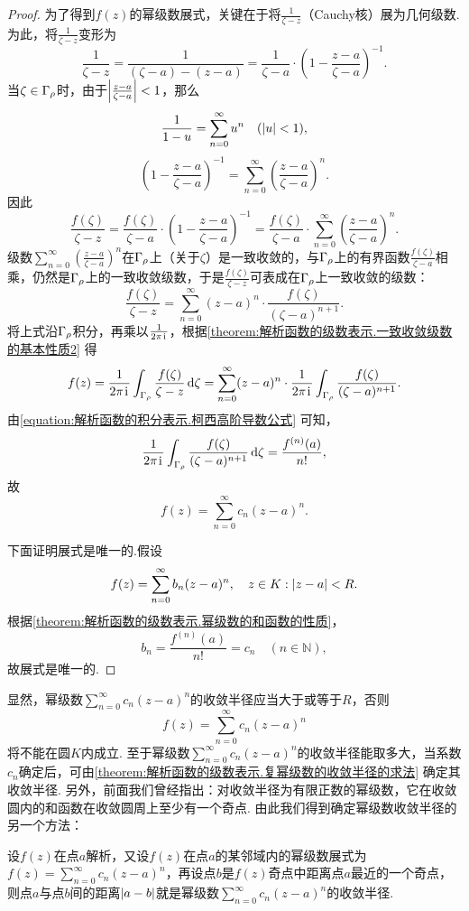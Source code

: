 \begin{theorem}
\begin{proof}
为了得到\(f(z)\)的幂级数展式，关键在于将\(\frac{1}{\zeta-z}\)（Cauchy核）展为几何级数.为此，将\(\frac{1}{\zeta-z}\)变形为\[
\frac{1}{\zeta-z}
= \frac{1}{(\zeta-a)-(z-a)}
= \frac{1}{\zeta-a} \cdot \left(1 - \frac{z-a}{\zeta-a}\right)^{-1}.
\]当\(\zeta \in \Gamma_{\rho}\)时，由于\(\abs{\frac{z-a}{\zeta-a}}<1\)，那么\[
\frac{1}{1-u} = \sum\limits_{n=0}^{\infty} u^n
\quad(\abs{u}<1),
\]\[
\left(1 - \frac{z-a}{\zeta-a}\right)^{-1}
= \sum\limits_{n=0}^{\infty} \left(\frac{z-a}{\zeta-a}\right)^n.
\]因此\[
\frac{f(\zeta)}{\zeta-z}
= \frac{f(\zeta)}{\zeta-a} \cdot \left(1 - \frac{z-a}{\zeta-a}\right)^{-1}
= \frac{f(\zeta)}{\zeta-a} \cdot \sum\limits_{n=0}^{\infty} \left(\frac{z-a}{\zeta-a}\right)^n.
\]级数\(\sum\limits_{n=0}^{\infty} \left(\frac{z-a}{\zeta-a}\right)^n\)在\(\Gamma_{\rho}\)上（关于\(\zeta\)）是一致收敛的，与\(\Gamma_{\rho}\)上的有界函数\(\frac{f(\zeta)}{\zeta-a}\)相乘，仍然是\(\Gamma_{\rho}\)上的一致收敛级数，于是\(\frac{f(\zeta)}{\zeta-z}\)可表成在\(\Gamma_{\rho}\)上一致收敛的级数：\[
\frac{f(\zeta)}{\zeta-z}
= \sum\limits_{n=0}^{\infty} (z-a)^n \cdot \frac{f(\zeta)}{(\zeta-a)^{n+1}}.
\]将上式沿\(\Gamma_{\rho}\)积分，再乘以\(\frac{1}{2\pi\kern1pt\mathrm{i}\kern1pt}\)，根据\cref{theorem:解析函数的级数表示.一致收敛级数的基本性质2} 得\[
f(z) = \frac{1}{2\pi\kern1pt\mathrm{i}\kern1pt} \int_{\Gamma_{\rho}} \frac{f(\zeta)}{\zeta-z} \dd{\zeta}
= \sum\limits_{n=0}^{\infty} (z-a)^n \cdot \frac{1}{2\pi\kern1pt\mathrm{i}\kern1pt} \int_{\Gamma_{\rho}} \frac{f(\zeta)}{(\zeta-a)^{n+1}}.
\]由\cref{equation:解析函数的积分表示.柯西高阶导数公式} 可知，\[
\frac{1}{2\pi\kern1pt\mathrm{i}\kern1pt} \int_{\Gamma_{\rho}} \frac{f(\zeta)}{(\zeta-a)^{n+1}} \dd{\zeta}
= \frac{f^{(n)}(a)}{n!},
\]故\[
f(z) = \sum\limits_{n=0}^{\infty} c_n (z-a)^n.
\]

下面证明展式是唯一的.假设\[
f(z) = \sum\limits_{n=0}^{\infty} b_n (z-a)^n,
\quad z \in K: \abs{z-a}<R.
\]根据\cref{theorem:解析函数的级数表示.幂级数的和函数的性质}，\[
b_n = \frac{f^{(n)}(a)}{n!} = c_n \quad (n\in\mathbb{N}),
\]故展式是唯一的.
\end{proof}
\end{theorem}
显然，幂级数\(\sum\limits_{n=0}^{\infty} c_n (z-a)^n\)的收敛半径应当大于或等于\(R\)，否则\[
f(z) = \sum\limits_{n=0}^{\infty} c_n (z-a)^n
\]将不能在圆\(K\)内成立.
至于幂级数\(\sum\limits_{n=0}^{\infty} c_n (z-a)^n\)的收敛半径能取多大，当系数\(c_n\)确定后，可由\cref{theorem:解析函数的级数表示.复幂级数的收敛半径的求法} 确定其收敛半径.
另外，前面我们曾经指出：对收敛半径为有限正数的幂级数，它在收敛圆内的和函数在收敛圆周上至少有一个奇点.
由此我们得到确定幂级数收敛半径的另一个方法：

设\(f(z)\)在点\(a\)解析，又设\(f(z)\)在点\(a\)的某邻域内的幂级数展式为\(f(z) = \sum\limits_{n=0}^{\infty} c_n (z-a)^n\)，再设点\(b\)是\(f(z)\)奇点中距离点\(a\)最近的一个奇点，则点\(a\)与点\(b\)间的距离\(\abs{a-b}\)就是幂级数\(\sum\limits_{n=0}^{\infty} c_n (z-a)^n\)的收敛半径.

